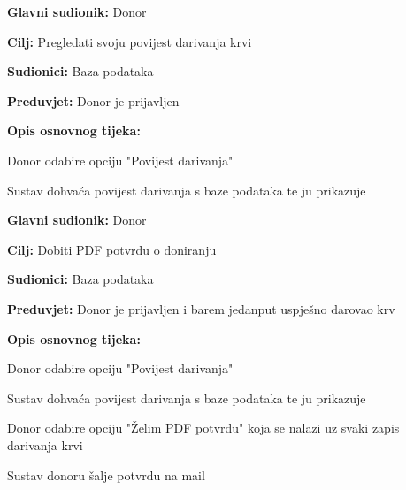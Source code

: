 					\begin{packed_item}
	
						\item \textbf{Glavni sudionik: }Donor
						\item \textbf{Cilj:} Pregledati svoju povijest darivanja krvi
						\item \textbf{Sudionici:} Baza podataka
						\item \textbf{Preduvjet:} Donor je prijavljen
						\item \textbf{Opis osnovnog tijeka:}
						
						\item[] \begin{packed_enum}
	
							\item Donor odabire opciju "Povijest darivanja"
							\item Sustav dohvaća povijest darivanja s baze podataka te ju prikazuje
							
						\end{packed_enum}

					\end{packed_item}
\eject 
\noindent {}
					\begin{packed_item}
	
						\item \textbf{Glavni sudionik:} Donor
						\item \textbf{Cilj:} Dobiti PDF potvrdu o doniranju
						\item \textbf{Sudionici:} Baza podataka
						\item \textbf{Preduvjet:} Donor je prijavljen i barem jedanput uspješno darovao krv
						\item \textbf{Opis osnovnog tijeka:}
						
						\item[] \begin{packed_enum}
	
							\item Donor odabire opciju "Povijest darivanja"
							\item Sustav dohvaća povijest darivanja s baze podataka te ju prikazuje
							\item Donor odabire opciju "Želim PDF potvrdu" koja se nalazi uz svaki zapis darivanja krvi
							\item Sustav donoru šalje potvrdu na mail
							
						\end{packed_enum}

					\end{packed_item}

